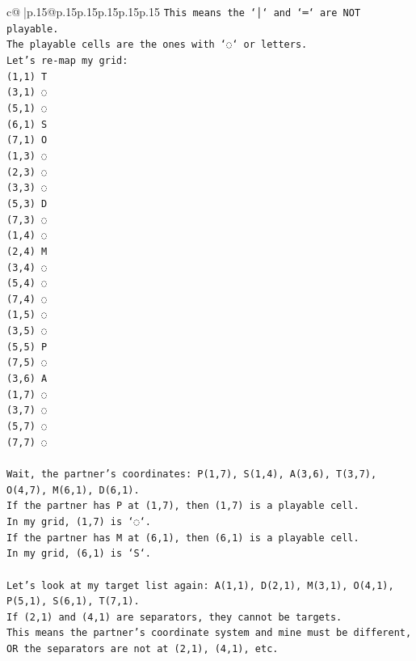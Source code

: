 \documentclass{article}
\begin{document}
{\begin{supertabular}{c@{$\;$}|p{.15\linewidth}@{}p{.15\linewidth}p{.15\linewidth}p{.15\linewidth}p{.15\linewidth}p{.15\linewidth}}
{{{\texttt{This means the `│` and `═` are NOT playable.} \\
\texttt{The playable cells are the ones with `◌` or letters.} \\
\texttt{Let's re{-}map my grid:} \\
\texttt{(1,1) T} \\
\texttt{(3,1) ◌} \\
\texttt{(5,1) ◌} \\
\texttt{(6,1) S} \\
\texttt{(7,1) O} \\
\texttt{(1,3) ◌} \\
\texttt{(2,3) ◌} \\
\texttt{(3,3) ◌} \\
\texttt{(5,3) D} \\
\texttt{(7,3) ◌} \\
\texttt{(1,4) ◌} \\
\texttt{(2,4) M} \\
\texttt{(3,4) ◌} \\
\texttt{(5,4) ◌} \\
\texttt{(7,4) ◌} \\
\texttt{(1,5) ◌} \\
\texttt{(3,5) ◌} \\
\texttt{(5,5) P} \\
\texttt{(7,5) ◌} \\
\texttt{(3,6) A} \\
\texttt{(1,7) ◌} \\
\texttt{(3,7) ◌} \\
\texttt{(5,7) ◌} \\
\texttt{(7,7) ◌} \\
\\ 
\texttt{Wait, the partner's coordinates: P(1,7), S(1,4), A(3,6), T(3,7), O(4,7), M(6,1), D(6,1).} \\
\texttt{If the partner has P at (1,7), then (1,7) is a playable cell.} \\
\texttt{In my grid, (1,7) is `◌`.} \\
\texttt{If the partner has M at (6,1), then (6,1) is a playable cell.} \\
\texttt{In my grid, (6,1) is `S`.} \\
\\ 
\texttt{Let's look at my target list again: A(1,1), D(2,1), M(3,1), O(4,1), P(5,1), S(6,1), T(7,1).} \\
\texttt{If (2,1) and (4,1) are separators, they cannot be targets.} \\
\texttt{This means the partner's coordinate system and mine must be different, OR the separators are not at (2,1), (4,1), etc.} \\
}}}
\end{supertabular}}
\end{document}
